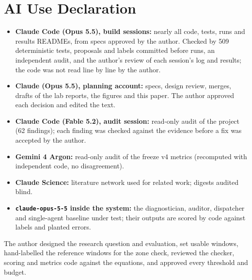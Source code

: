\documentclass[conference]{IEEEtran}
\begin{document}
\section*{AI Use Declaration}
\begin{itemize}
\item \textbf{Claude Code (Opus 5.5), build sessions:} nearly all code, tests, runs and results READMEs, from specs approved by the author. Checked by 509 deterministic tests, proposals and labels committed before runs, an independent audit, and the author's review of each session's log and results; the code was not read line by line by the author.
\item \textbf{Claude (Opus 5.5), planning account:} specs, design review, merges, drafts of the lab reports, the figures and this paper. The author approved each decision and edited the text.
\item \textbf{Claude Code (Fable 5.2), audit session:} read-only audit of the project (62 findings); each finding was checked against the evidence before a fix was accepted by the author.
\item \textbf{Gemini 4 Argon:} read-only audit of the freeze v4 metrics (recomputed with independent code, no disagreement).
\item \textbf{Claude Science:} literature network used for related work; digests audited blind.
\item \textbf{\texttt{claude-opus-5-5} inside the system:} the diagnostician, auditor, dispatcher and single-agent baseline under test; their outputs are scored by code against labels and planted errors.
\end{itemize}
The author designed the research question and evaluation, set usable windows, hand-labelled the reference windows for the zone check, reviewed the checker, scoring and metrics code against the equations, and approved every threshold and budget.
\end{document}
